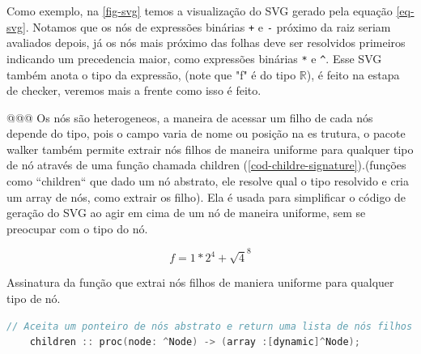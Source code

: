 Como exemplo, na \autoref{fig-svg} temos a visualização do SVG gerado pela equação \autoref{eq-svg}. Notamos que os nós de expressões binárias \texttt{+} e \texttt{-} próximo da raiz seriam avaliados depois, já os nós mais próximo das folhas deve ser resolvidos primeiros indicando um precedencia maior, como expressões binárias \texttt{*} e \texttt{\^}. Esse SVG também anota o tipo da expressão, (note que "f" é do tipo $\mathbb{R}$), é feito na estapa de checker, veremos mais a frente como isso é feito.
 

@@@
Os nós são heterogeneos, a maneira de acessar um filho de cada nós depende do tipo, pois o campo varia de nome ou posição na es trutura, o pacote walker também permite extrair nós filhos de maneira uniforme para qualquer tipo de nó através de uma função chamada children (\autoref{cod-childre-signature}).(funções como ``children`` que dado um nó abstrato, ele resolve qual o tipo resolvido e cria um array de nós, como extrair os filho). Ela é usada para simplificar o código de geração do SVG ao agir em cima de um nó de maneira uniforme, sem se preocupar com o tipo do nó.

\begin{equation} \label{eq-svg}
   f =  1*2 ^ 4 +  \sqrt 4^8
\end{equation}


\begin{codigo}[htb]
        \caption{\small Assinatura da função que extrai nós filhos de maniera uniforme para qualquer tipo de nó. }
        \label{cod-childre-signature}
  \begin{lstlisting}[language = C]
    // Aceita um ponteiro de nós abstrato e return uma lista de nós filhos
    children :: proc(node: ^Node) -> (array :[dynamic]^Node);
  \end{lstlisting}
\end{codigo}

